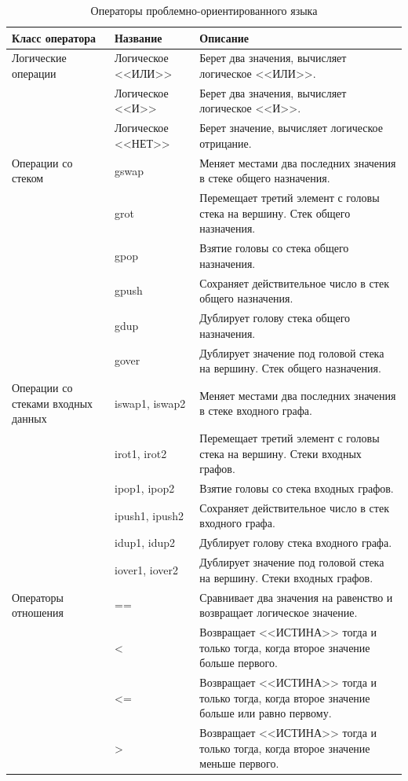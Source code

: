 \documentclass[russian,utf8,emptystyle]{eskdtext}
\begin{document}
\begin{spacing}{1.5}
\begin{longtable}{p{4cm}|p{3cm}|p{7cm}}
\caption{Операторы проблемно-ориентированного языка}
\label{tab:dsl_operators} \\
Класс оператора & Название & Описание \\ 
\hline 
Логические операции
  & Логическое <<ИЛИ>> & Берет два значения, вычисляет логическое <<ИЛИ>>. \\ 
  & Логическое <<И>> & Берет два значения, вычисляет логическое <<И>>. \\
  & Логическое <<НЕТ>> & Берет значение, вычисляет логическое отрицание. \\
\hline
Операции со стеком
  & gswap & Меняет местами два последних значения в стеке общего назначения. \\
  & grot  & Перемещает третий элемент с головы стека на вершину. Стек общего назначения. \\
  & gpop  & Взятие головы со стека общего назначения. \\
  & gpush & Сохраняет действительное число в стек общего назначения. \\
  & gdup  & Дублирует голову стека общего назначения. \\
  & gover & Дублирует значение под головой стека на вершину. Стек общего назначения. \\
\hline
Операции со стеками входных данных
  & iswap1, iswap2 & Меняет местами два последних значения в стеке входного графа. \\
  & irot1, irot2  & Перемещает третий элемент с головы стека на вершину. Стеки входных графов. \\
  & ipop1, ipop2  & Взятие головы со стека входных графов. \\
  & ipush1, ipush2 & Сохраняет действительное число в стек входного графа. \\
  & idup1, idup2  & Дублирует голову стека входного графа. \\
  & iover1, iover2 & Дублирует значение под головой стека на вершину. Стеки входных графов. \\
\hline
Операторы отношения 
  & == & Сравнивает два значения на равенство и возвращает логическое значение. \\
  & <  & Возвращает <<ИСТИНА>> тогда и только тогда, когда второе значение больше первого. \\
  & <= & Возвращает <<ИСТИНА>> тогда и только тогда, когда второе значение больше или равно первому. \\
  & >  & Возвращает <<ИСТИНА>> тогда и только тогда, когда второе значение меньше первого. \\

\end{longtable}
\end{spacing}
\end{document}
